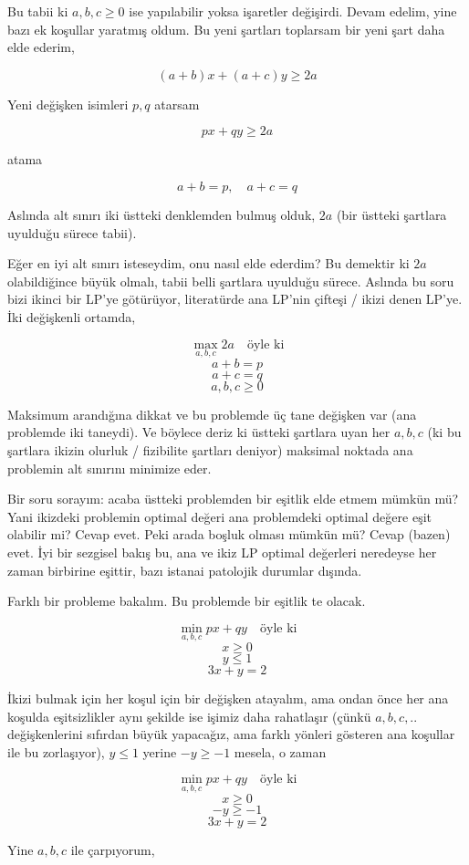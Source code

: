 \documentclass[12pt,fleqn]{article}\usepackage{../../common}
\begin{document}
Bu tabii ki $a,b,c \ge 0$ ise yapılabilir yoksa işaretler değişirdi. Devam
edelim, yine bazı ek koşullar yaratmış oldum. Bu yeni şartları toplarsam
bir yeni şart daha elde ederim,

$$
(a+b)x + (a+c)y \ge 2a
$$

Yeni değişken isimleri $p,q$ atarsam

$$
px + qy \ge 2a
$$

atama

$$
a+b = p, \quad a+c = q
$$

Aslında alt sınırı iki üstteki denklemden bulmuş olduk, $2a$ (bir üstteki
şartlara uyulduğu sürece tabii).

Eğer en iyi alt sınırı isteseydim, onu nasıl elde ederdim? Bu demektir ki
$2a$ olabildiğince büyük olmalı, tabii belli şartlara uyulduğu
sürece. Aslında bu soru bizi ikinci bir LP'ye götürüyor, literatürde ana
LP'nin çifteşi / ikizi denen LP'ye. İki değişkenli ortamda,

$$
\max_{a,b,c} 2a \quad \textrm{öyle ki}
$$
$$
a + b = p
$$
$$
a + c = q
$$
$$
a,b,c \ge 0
$$

Maksimum arandığına dikkat ve bu problemde üç tane değişken var (ana
problemde iki taneydi). Ve böylece deriz ki üstteki şartlara uyan her
$a,b,c$ (ki bu şartlara ikizin olurluk / fizibilite şartları deniyor)
maksimal noktada ana problemin alt sınırını minimize eder.

Bir soru sorayım: acaba üstteki problemden bir eşitlik elde etmem mümkün
mü? Yani ikizdeki problemin optimal değeri ana problemdeki optimal değere
eşit olabilir mi? Cevap evet. Peki arada boşluk olması mümkün mü? Cevap
(bazen) evet. İyi bir sezgisel bakış bu, ana ve ikiz LP optimal değerleri
neredeyse her zaman birbirine eşittir, bazı istanai patolojik durumlar
dışında.

Farklı bir probleme bakalım. Bu problemde bir eşitlik te olacak. 

$$
\min_{a,b,c} px + qy \quad \textrm{öyle ki}
$$
$$
x \ge 0
$$
$$
y \le 1
$$
$$
3x + y = 2
$$

İkizi bulmak için her koşul için bir değişken atayalım, ama ondan önce her
ana koşulda eşitsizlikler aynı şekilde ise işimiz daha rahatlaşır (çünkü
$a,b,c,..$ değişkenlerini sıfırdan büyük yapacağız, ama farklı yönleri
gösteren ana koşullar ile bu zorlaşıyor), $y \le 1$ yerine $-y \ge -1$
mesela, o zaman

$$
\min_{a,b,c} px + qy \quad \textrm{öyle ki}
$$
$$
x \ge 0
$$
$$
-y \ge -1
$$
$$
3x + y = 2
$$

Yine $a,b,c$ ile çarpıyorum, 
\end{document}
